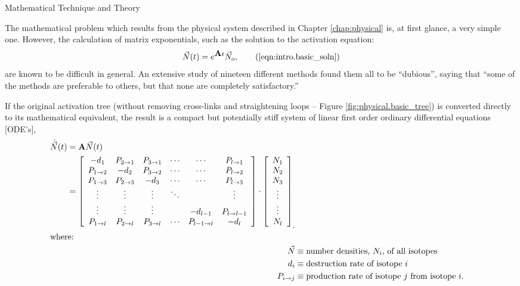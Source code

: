 
\begin{chapter}{Mathematical Technique and Theory\label{chap:math}}
  
  The mathematical problem which results from the physical system
  described in Chapter \ref{chap:physical} is, at first glance, a very
  simple one.  However, the calculation of matrix exponentials, such
  as the solution to the activation equation:
  \begin{equation}
    \vec{N}(t) = e^{\mat{A} t} \vec{N}_o,\tag{\ref{eqn:intro.basic_soln}}
  \end{equation}
  are known to be difficult in general.  An extensive study of
  nineteen different methods found them all to be ``dubious'', saying
  that ``some of the methods are preferable to others, but that none
  are completely satisfactory.''\cite{DUBIOUS}
  
  If the original activation tree (without removing cross-links and
  straightening loops -- Figure \ref{fig:physical.basic_tree}) is
  converted directly to its mathematical equivalent, the result is a
  compact but potentially stiff system of linear first order ordinary
  differential equations [ODE's],
  \begin{align}
    \begin{split}
      \dot{\vec{N}}(t) &= \mbox{$\mathbf{A}$}\vec{N}(t)\\
        &= \left [
          \begin{array}{cccccc}
            -d_1 & P_{2\rightarrow 1} & P_{3\rightarrow 1} & \cdots & \cdots & P_{l\rightarrow 1}\\
            P_{1\rightarrow 2} & -d_2 & P_{3\rightarrow 2} & \cdots & \cdots & P_{l\rightarrow 2}\\
            P_{1\rightarrow 3} & P_{2\rightarrow 3} & -d_3 & \cdots & \cdots & P_{l\rightarrow 3}\\
            \vdots & \vdots & \vdots & \ddots &  & \vdots\\
            \vdots & \vdots & \vdots & & -d_{l-1} & P_{l\rightarrow l-1}\\
            P_{1\rightarrow l} & P_{2\rightarrow l} & P_{3\rightarrow l} & \cdots & P_{l-1\rightarrow l} & -d_l
          \end{array} \right ] \cdot \left [
          \begin{array}{c}
            N_1 \\ N_2 \\ N_3 \\ \vdots \\ \vdots \\ N_l
          \end{array} \right ]_,
    \end{split}\label{eq:math.intro.explicit}\\
    \intertext{where:}
    \vec{N} &\equiv \text{number densities, $N_i$, of all isotopes}\notag \\
    d_i &\equiv \text{destruction rate of isotope $i$}\notag \\
    P_{i\rightarrow j} &\equiv \text{production rate of isotope $j$ from isotope $i$.}\notag
  \end{align}
  

\end{chapter}
